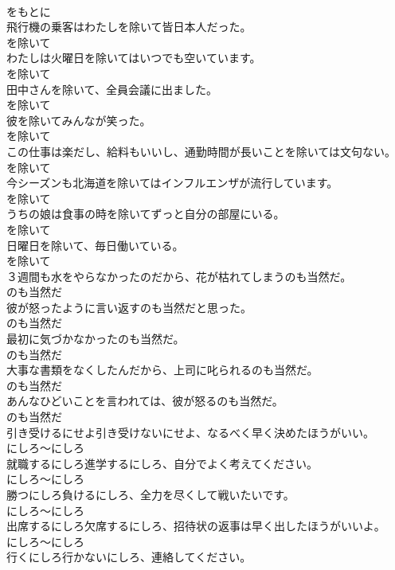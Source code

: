 \documentclass[8pt]{extreport}
\begin{document}
\begin{CJK}{UTF8}{min}
\\	をもとに
\\	飛行機の乗客はわたしを除いて皆日本人だった。	
\\	を除いて
\\	わたしは火曜日を除いてはいつでも空いています。	
\\	を除いて
\\	田中さんを除いて、全員会議に出ました。	
\\	を除いて
\\	彼を除いてみんなが笑った。	
\\	を除いて
\\	この仕事は楽だし、給料もいいし、通勤時間が長いことを除いては文句ない。	
\\	を除いて
\\	今シーズンも北海道を除いてはインフルエンザが流行しています。	
\\	を除いて
\\	うちの娘は食事の時を除いてずっと自分の部屋にいる。	
\\	を除いて
\\	日曜日を除いて、毎日働いている。	
\\	を除いて
\\	３週間も水をやらなかったのだから、花が枯れてしまうのも当然だ。	
\\	のも当然だ
\\	彼が怒ったように言い返すのも当然だと思った。	
\\	のも当然だ
\\	最初に気づかなかったのも当然だ。	
\\	のも当然だ
\\	大事な書類をなくしたんだから、上司に叱られるのも当然だ。	
\\	のも当然だ
\\	あんなひどいことを言われては、彼が怒るのも当然だ。	
\\	のも当然だ
\\	引き受けるにせよ引き受けないにせよ、なるべく早く決めたほうがいい。	
\\	にしろ～にしろ
\\	就職するにしろ進学するにしろ、自分でよく考えてください。	
\\	にしろ～にしろ
\\	勝つにしろ負けるにしろ、全力を尽くして戦いたいです。	
\\	にしろ～にしろ
\\	出席するにしろ欠席するにしろ、招待状の返事は早く出したほうがいいよ。	
\\	にしろ～にしろ
\\	行くにしろ行かないにしろ、連絡してください。	

\end{CJK}
\end{document}
